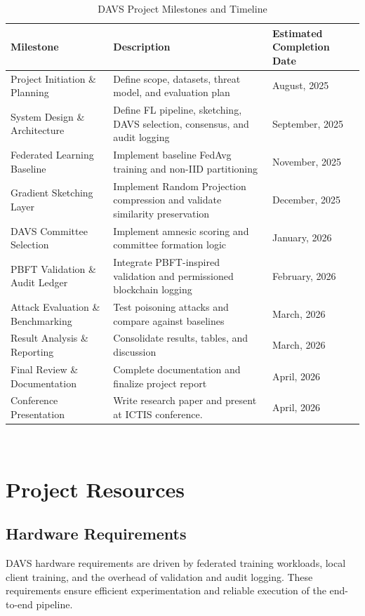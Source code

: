 \begin{table}[h!]
\centering
\begin{tabular}{|p{4cm}|p{7cm}|p{4cm}|}
\hline
\textbf{Milestone} & \textbf{Description} & \textbf{Estimated Completion Date} \\
\hline
Project Initiation \& Planning & Define scope, datasets, threat model, and evaluation plan & August, 2025 \\
\hline
System Design \& Architecture & Define FL pipeline, sketching, DAVS selection, consensus, and audit logging & September, 2025 \\
\hline
Federated Learning Baseline & Implement baseline FedAvg training and non-IID partitioning & November, 2025 \\
\hline
Gradient Sketching Layer & Implement Random Projection compression and validate similarity preservation & December, 2025 \\
\hline
DAVS Committee Selection & Implement amnesic scoring and committee formation logic & January, 2026 \\
\hline
PBFT Validation \& Audit Ledger & Integrate PBFT-inspired validation and permissioned blockchain logging & February, 2026 \\
\hline
Attack Evaluation \& Benchmarking & Test poisoning attacks and compare against baselines & March, 2026 \\
\hline
Result Analysis \& Reporting & Consolidate results, tables, and discussion & March, 2026 \\
\hline
Final Review \& Documentation & Complete documentation and finalize project report & April, 2026 \\
\hline
Conference Presentation & Write research paper and present at ICTIS conference. & April, 2026 \\
\hline
\end{tabular}
\caption{DAVS Project Milestones and Timeline}
\end{table}

\\ 


\section{Project Resources}

\subsection{Hardware Requirements}
DAVS hardware requirements are driven by federated training workloads, local client training, and the overhead of validation and audit logging. These requirements ensure efficient experimentation and reliable execution of the end-to-end pipeline.

